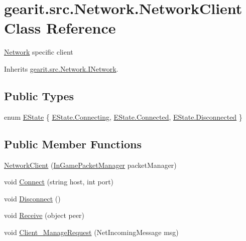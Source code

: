 \hypertarget{classgearit_1_1src_1_1_network_1_1_network_client}{\section{gearit.\+src.\+Network.\+Network\+Client Class Reference}
\label{classgearit_1_1src_1_1_network_1_1_network_client}
}


\hyperlink{namespacegearit_1_1src_1_1_network}{Network} specific client  




Inherits \hyperlink{classgearit_1_1src_1_1_network_1_1_i_network}{gearit.\+src.\+Network.\+I\+Network}.

\subsection*{Public Types}
\begin{DoxyCompactItemize}
\item 
enum \hyperlink{classgearit_1_1src_1_1_network_1_1_network_client_a8c5d63a28969b69f509466b1e2138aee}{E\+State} \{ \hyperlink{classgearit_1_1src_1_1_network_1_1_network_client_a8c5d63a28969b69f509466b1e2138aeeae321c53b354930ba96f0243e652df458}{E\+State.\+Connecting}, 
\hyperlink{classgearit_1_1src_1_1_network_1_1_network_client_a8c5d63a28969b69f509466b1e2138aeea2ec0d16e4ca169baedb9b2d50ec5c6d7}{E\+State.\+Connected}, 
\hyperlink{classgearit_1_1src_1_1_network_1_1_network_client_a8c5d63a28969b69f509466b1e2138aeeaef70e46fd3bbc21e3e1f0b6815e750c0}{E\+State.\+Disconnected}
 \}
\end{DoxyCompactItemize}
\subsection*{Public Member Functions}
\begin{DoxyCompactItemize}
\item 
\hyperlink{classgearit_1_1src_1_1_network_1_1_network_client_a70548a9748e4545628f87ffb4ed500b8}{Network\+Client} (\hyperlink{classgearit_1_1src_1_1_network_1_1_in_game_packet_manager}{In\+Game\+Packet\+Manager} packet\+Manager)
\item 
void \hyperlink{classgearit_1_1src_1_1_network_1_1_network_client_afcc11cbd1fd2d786b116c2d1d30f59b8}{Connect} (string host, int port)
\item 
void \hyperlink{classgearit_1_1src_1_1_network_1_1_network_client_a74a0f4fec48f511889a274c0055439e2}{Disconnect} ()
\item 
void \hyperlink{classgearit_1_1src_1_1_network_1_1_network_client_a9277f91c13b8af94e4fc8ff694c6a921}{Receive} (object peer)
\item 
void \hyperlink{classgearit_1_1src_1_1_network_1_1_network_client_aaec0a47a10708def5d2f1bd3394381d9}{Client\+\_\+\+Manage\+Request} (Net\+Incoming\+Message msg)
\end{DoxyCompactItemize}
